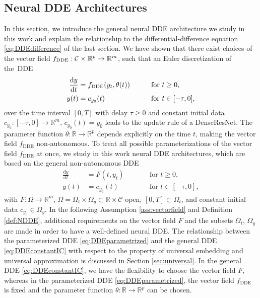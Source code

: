 \documentclass[10pt]{article}
\numberwithin{equation}{section}
\newcommand*{\dd}{\mathrm{d}}
\newcommand{\R}{\mathbb{R}}
\begin{document}
	
	
	\subsection{Neural DDE Architectures}
	\label{sec:architecture}
	
	In this section, we introduce the general neural DDE architecture we study in this work and explain the relationship to the differential-difference equation \eqref{eq:DDEdifference} of the last section. We have shown that there exist choices of the vector field $f_\textup{DDE}: \mathcal{C} \times \mathbb{R}^{p}\rightarrow \mathbb{R}^m$, such that an Euler discretization of the~DDE
	\begin{equation} \label{eq:DDEparametrized}
		\begin{aligned}
			\frac{\dd y}{\dd t} &= f_\textup{DDE}(y_t,\theta(t)) \qquad &&\text{for } t\geq 0, \\  
			y(t) &= c_{y_0}(t) &&\text{for } t \in [-\tau,0],
		\end{aligned}
	\end{equation} 
	over the time interval $[0,T]$ with delay $\tau \geq 0$ and constant initial data $c_{y_0}:[-\tau,0]\rightarrow \mathbb{R}^m$, $c_{y_0}(t) = y_0$ leads to the update rule of a DenseResNet. The parameter function $\theta:\mathbb{R}\rightarrow \mathbb{R}^{p}$ depends explicitly on the time $t$, making the vector field  $f_\text{DDE}$ non-autonomous. To treat all possible parameterizations of the vector field $f_\text{DDE}$ at once, we study in this work neural DDE architectures, which are based on the  general non-autonomous DDE
	\begin{equation} \label{eq:DDEconstantIC}
		\begin{aligned}
			\frac{\dd y}{\dd t} &= F(t,y_t) \qquad &&\text{for } t\geq 0, \\  
			y(t) &= c_{y_0}(t) &&\text{for } t \in [-\tau,0],
		\end{aligned}
	\end{equation}
	with  $F:\Omega\rightarrow \mathbb{R}^m$, $\Omega = \Omega_t \times \Omega_y \subset \mathbb{R}\times \mathcal{C}$ open, $[0,T]\subset \Omega_t$, and constant initial data $c_{y_0}\in \Omega_y$. In the following Assumption \ref{ass:vectorfield}  and Definition \ref{def:NDDE}, additional requirements on the vector field $F$ and the subsets $\Omega_t$, $\Omega_y$ are made in order to have a well-defined neural DDE. The relationship between the parameterized DDE \eqref{eq:DDEparametrized} and the general DDE \eqref{eq:DDEconstantIC} with respect to the property of universal embedding and universal approximation is discussed in Section \ref{sec:universal}. In the general DDE \eqref{eq:DDEconstantIC}, we have the flexibility to choose the vector field $F$, whereas in the parameterized DDE \eqref{eq:DDEparametrized}, the vector field $f_\text{DDE}$ is fixed and the parameter function $\theta: \R \rightarrow \R^p$ can be chosen. 
	
\end{document}
